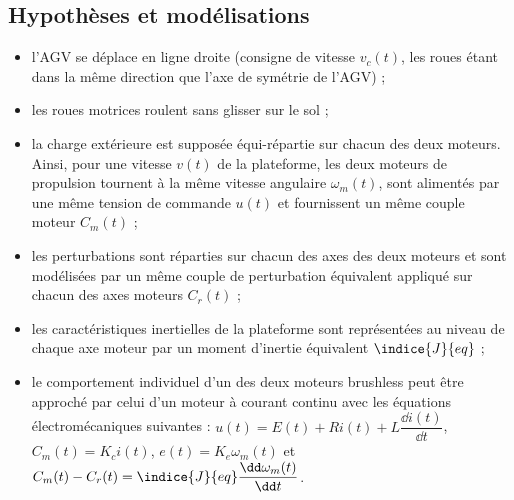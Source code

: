 \subsection*{Hypothèses et modélisations}
\begin{itemize}
\item l’AGV se déplace en ligne droite (consigne de vitesse $v_c(t)$, les roues étant dans la même
direction que l’axe de symétrie de l’AGV) ;
\item les roues motrices roulent sans glisser sur le sol ;
\item la charge extérieure est supposée équi-répartie sur chacun des deux moteurs. Ainsi, pour une
vitesse $v(t)$ de la plateforme, les deux moteurs de propulsion tournent à la même vitesse angulaire $\omega_m(t)$, sont alimentés par une même tension de commande $u(t)$ et fournissent un même
couple moteur $C_m(t)$ ;
\item les perturbations sont réparties sur chacun des axes des deux moteurs et sont modélisées par
un même couple de perturbation équivalent appliqué sur chacun des axes moteurs $C_r(t)$ ;
\item les caractéristiques inertielles de la plateforme sont représentées au niveau de chaque axe
moteur par un moment d’inertie équivalent $\indice{J}{eq}$ ;
\item le comportement individuel d’un des deux moteurs brushless peut être approché par celui d’un
moteur à courant continu avec les équations électromécaniques suivantes :
$u(t)=E(t)+Ri(t)+L\dfrac{\dd i(t)}{\dd t}$, $C_m(t)=K_c i(t)$, $e(t)=K_e \omega_m(t)$ et $C_m(t)-C_r(t)=\indice{J}{eq} \dfrac{\dd \omega_m(t)}{\dd t}  $. 
\end{itemize}

